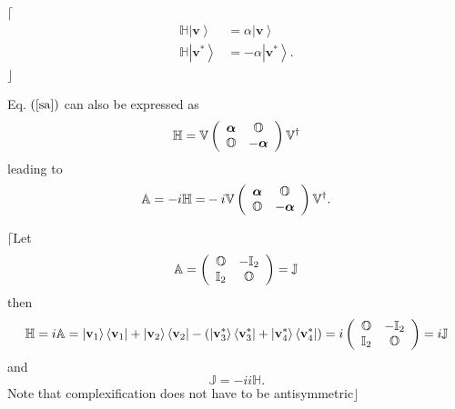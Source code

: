 \documentclass[aps,preprint]{revtex4}%
\begin{document}
$\lceil$%
\begin{align}
\mathbb{H}\left\vert \mathbf{v}\right\rangle  &  =\alpha\left\vert
\mathbf{v}\right\rangle \\
\mathbb{H}\left\vert \mathbf{v}^{\ast}\right\rangle  &  =-\alpha\left\vert
\mathbf{v}^{\ast}\right\rangle .
\end{align}
$\rfloor$

Eq. $\left(  \ref{sa}\right)  $ can also be expressed as
\begin{equation}
\mathbb{H}=\mathbb{V}\left(
\begin{array}
[c]{cc}%
\boldsymbol{\alpha} & \mathbb{O}\\
\mathbb{O} & -\boldsymbol{\alpha}%
\end{array}
\right)  \mathbb{V}^{\dagger}%
\end{equation}
leading to
\begin{equation}
\mathbb{A}=-i\mathbb{H=}-i\mathbb{V}\left(
\begin{array}
[c]{cc}%
\boldsymbol{\alpha} & \mathbb{O}\\
\mathbb{O} & -\boldsymbol{\alpha}%
\end{array}
\right)  \mathbb{V}^{\dagger}.
\end{equation}


$\lceil$Let
\begin{equation}
\mathbb{A}=\left(
\begin{array}
[c]{cc}%
\mathbb{O} & -\mathbb{I}_{2}\\
\mathbb{I}_{2} & \mathbb{O}%
\end{array}
\right)  =\mathbb{J}%
\end{equation}
then
\begin{equation}
\mathbb{H}=i\mathbb{A}=\left\vert \mathbf{v}_{1}\right\rangle \left\langle
\mathbf{v}_{1}\right\vert +\left\vert \mathbf{v}_{2}\right\rangle \left\langle
\mathbf{v}_{2}\right\vert -\left(  \left\vert \mathbf{v}_{3}^{\ast
}\right\rangle \left\langle \mathbf{v}_{3}^{\ast}\right\vert +\left\vert
\mathbf{v}_{4}^{\ast}\right\rangle \left\langle \mathbf{v}_{4}^{\ast
}\right\vert \right)  =i\left(
\begin{array}
[c]{cc}%
\mathbb{O} & -\mathbb{I}_{2}\\
\mathbb{I}_{2} & \mathbb{O}%
\end{array}
\right)  =i\mathbb{J}%
\end{equation}
and
\begin{equation}
\mathbb{J=-}ii\mathbb{H}.
\end{equation}
Note that complexification does not have to be antisymmetric$\rfloor$
\end{document}
